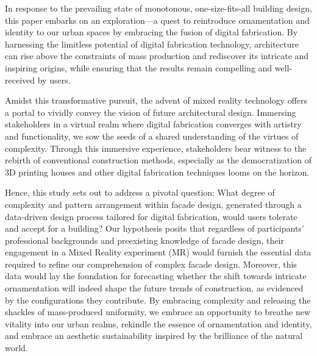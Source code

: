 In response to the prevailing state of monotonous, one-size-fits-all building design, this paper embarks on an exploration—a quest to reintroduce ornamentation and identity to our urban spaces by embracing the fusion of digital fabrication. By harnessing the limitless potential of digital fabrication technology, architecture can rise above the constraints of mass production and rediscover its intricate and inspiring origins, while ensuring that the results remain compelling and well-received by users.

Amidst this transformative pursuit, the advent of mixed reality technology offers a portal to vividly convey the vision of future architectural design. Immersing stakeholders in a virtual realm where digital fabrication converges with artistry and functionality, we sow the seeds of a shared understanding of the virtues of complexity. Through this immersive experience, stakeholders bear witness to the rebirth of conventional construction methods, especially as the democratization of 3D printing houses and other digital fabrication techniques looms on the horizon.

Hence, this study sets out to address a pivotal question: What degree of complexity and pattern arrangement within facade design, generated through a data-driven design process tailored for digital fabrication, would users tolerate and accept for a building? Our hypothesis posits that regardless of participants' professional backgrounds and preexisting knowledge of facade design, their engagement in a Mixed Reality experiment (MR) would furnish the essential data required to refine our comprehension of complex facade design. Moreover, this data would lay the foundation for forecasting whether the shift towards intricate ornamentation will indeed shape the future trends of construction, as evidenced by the configurations they contribute. By embracing complexity and releasing the shackles of mass-produced uniformity, we embrace an opportunity to breathe new vitality into our urban realms, rekindle the essence of ornamentation and identity, and embrace an aesthetic sustainability inspired by the brilliance of the natural world.



        

